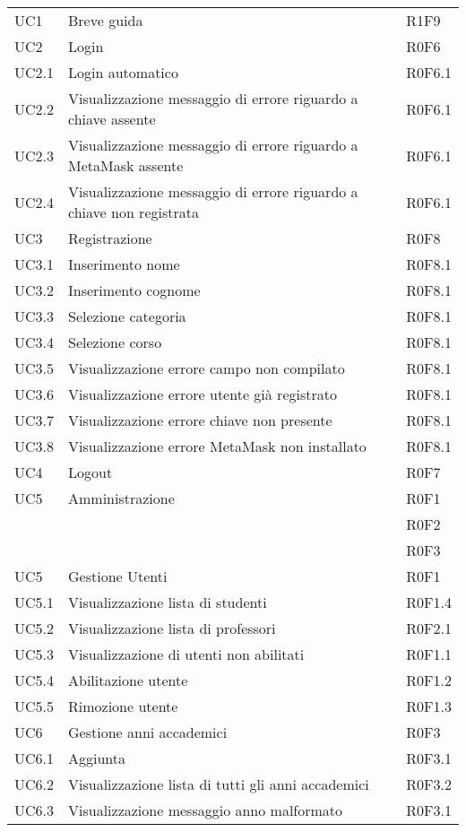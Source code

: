 \documentclass[AnalisiDeiRequisiti.tex]{subfiles}
\begin{document}
\begin{longtable}[H]{p{2cm}p{5cm}p{5cm}}
	UC1 & Breve guida & R1F9 \\  
	UC2 & Login & R0F6 \\  
	UC2.1 & Login automatico & R0F6.1 \\  
	UC2.2 & Visualizzazione messaggio di errore riguardo a chiave assente & R0F6.1 \\  
	UC2.3 & Visualizzazione messaggio di errore riguardo a MetaMask assente & R0F6.1 \\  
	UC2.4 & Visualizzazione messaggio di errore riguardo a chiave non registrata & R0F6.1 \\  
	UC3 & Registrazione & R0F8 \\
	UC3.1 & Inserimento nome & R0F8.1 \\  
	UC3.2 & Inserimento cognome & R0F8.1 \\  
	UC3.3 & Selezione categoria & R0F8.1 \\  
	UC3.4 & Selezione corso & R0F8.1 \\  
	UC3.5 & Visualizzazione errore campo non compilato & R0F8.1 \\  
	UC3.6 & Visualizzazione errore utente già registrato & R0F8.1 \\  
	UC3.7 & Visualizzazione errore chiave non presente & R0F8.1 \\  
	UC3.8 & Visualizzazione errore MetaMask non installato & R0F8.1 \\  
	UC4 & Logout & R0F7 \\  
	UC5 & Amministrazione &  R0F1 \\ 
	& & R0F2 \\
	& & R0F3 \\  
	UC5 & Gestione Utenti &  R0F1 \\  
	UC5.1 & Visualizzazione lista di studenti & R0F1.4 \\  
	UC5.2 & Visualizzazione lista di professori &  R0F2.1\\  
	UC5.3 & Visualizzazione di utenti non abilitati & R0F1.1 \\  
	UC5.4 & Abilitazione utente & R0F1.2 \\    
	UC5.5 & Rimozione utente & R0F1.3 \\  
	UC6 & Gestione anni accademici &  R0F3 \\  
	UC6.1 & Aggiunta \citGloss{anno accademico} &  R0F3.1 \\  
	UC6.2 & Visualizzazione lista di tutti gli anni accademici & R0F3.2 \\   
	UC6.3 & Visualizzazione messaggio anno malformato & R0F3.1 \\  

\end{longtable}
\end{document}
